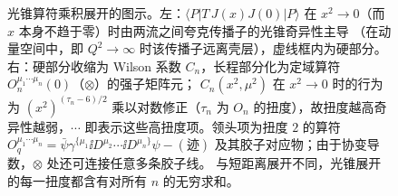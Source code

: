 \begin{figure}[htbp]
\caption{光锥算符乘积展开的图示。左：$\langle P|T\,J(x)J(0)|P\rangle$ 在 $x^2\to0$（而 $x$ 本身不趋于零）时由两流之间夸克传播子的光锥奇异性主导
（在动量空间中，即 $Q^2\to\infty$ 时该传播子远离壳层），虚线框内为硬部分。右：硬部分收缩为 Wilson 系数 $C_n$，长程部分化为定域算符 $O_n^{\mu_1\cdots\mu_n}(0)$（$\otimes$）的强子矩阵元；
$C_n(x^2,\mu^2)$ 在 $x^2\to0$ 时的行为为 $(x^2)^{(\tau_n-6)/2}$ 乘以对数修正（$\tau_n$ 为 $O_n$ 的扭度），故扭度越高奇异性越弱，$\cdots$ 即表示这些高扭度项。领头项为扭度 $2$ 的算符
$O_q^{\mu_1\cdots\mu_n}=\bar\psi\gamma^{\{\mu_1}\ii D^{\mu_2}\cdots\ii D^{\mu_n\}}\psi-(\text{迹})$ 及其胶子对应物；由于协变导数，$\otimes$ 处还可连接任意多条胶子线。
与短距离展开不同，光锥展开的每一扭度都含有对所有 $n$ 的无穷求和。}
\label{fig:ope-schematic}
\end{figure}

